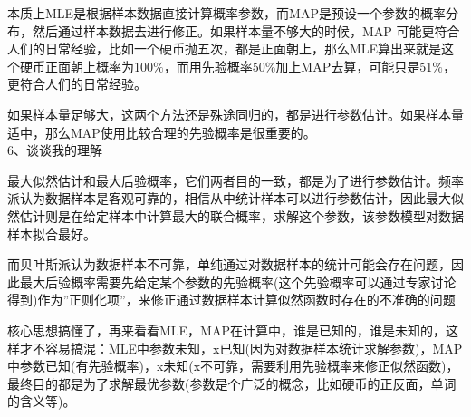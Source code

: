 本质上MLE是根据样本数据直接计算概率参数，而MAP是预设一个参数的概率分布，然后通过样本数据去进行修正。如果样本量不够大的时候，MAP 可能更符合人们的日常经验，比如一个硬币抛五次，都是正面朝上，那么MLE算出来就是这个硬币正面朝上概率为100$\%$，而用先验概率50$\%$加上MAP去算，可能只是51$\%$，更符合人们的日常经验。

如果样本量足够大，这两个方法还是殊途同归的，都是进行参数估计。如果样本量适中，那么MAP使用比较合理的先验概率是很重要的。 \\

6、谈谈我的理解

最大似然估计和最大后验概率，它们两者目的一致，都是为了进行参数估计。频率派认为数据样本是客观可靠的，相信从中统计样本可以进行参数估计，因此最大似然估计则是在给定样本中计算最大的联合概率，求解这个参数，该参数模型对数据样本拟合最好。

而贝叶斯派认为数据样本不可靠，单纯通过对数据样本的统计可能会存在问题，因此最大后验概率需要先给定某个参数的先验概率(这个先验概率可以通过专家讨论得到)作为”正则化项”，来修正通过数据样本计算似然函数时存在的不准确的问题

核心思想搞懂了，再来看看MLE，MAP在计算中，谁是已知的，谁是未知的，这样才不容易搞混：MLE中参数未知，x已知(因为对数据样本统计求解参数)，MAP中参数已知(有先验概率)，x未知(x不可靠，需要利用先验概率来修正似然函数)，最终目的都是为了求解最优参数(参数是个广泛的概念，比如硬币的正反面，单词的含义等)。


